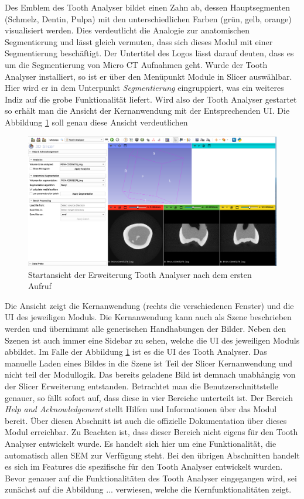 Des Emblem des Tooth Analyser bildet einen Zahn ab, dessen Hauptsegmenten (Schmelz,
Dentin, Pulpa) mit den unterschiedlichen Farben (grün, gelb, orange) visualisiert
werden. Dies verdeutlicht die Analogie zur anatomischen Segmentierung und lässt
gleich vermuten, dass sich dieses Modul mit einer Segmentierung beschäftigt. Der
Untertitel des Logos lässt darauf deuten, dass es um die Segmentierung von Micro
\ac{CT} Aufnahmen geht. Wurde der Tooth Analyser installiert, so ist er über den
Menüpunkt Module in Slicer auswählbar. Hier wird er in dem Unterpunkt \textit{Segmentierung}
eingruppiert, was ein weiteres Indiz auf die grobe Funktionalität liefert. Wird
also der Tooth Analyser gestartet so erhält man die Ansicht der Kernanwendung
mit der Entsprechenden \ac{UI}. Die Abbildung \ref{fig:tooth_analyser_start_up}
soll genau diese Ansicht verdeutlichen

\begin{figure}[h]
	\centering
	\includegraphics[scale=0.2, width=\textwidth]{img/toothAnalyserStarUp.png}
	\caption{Startansicht der Erweiterung Tooth Analyser nach dem ersten Aufruf}
	\label{fig:tooth_analyser_start_up}
\end{figure}

Die Ansicht zeigt die Kernanwendung (rechts die verschiedenen Fenster) und die
\ac{UI} des jeweiligen Moduls. Die Kernanwendung kann auch als Szene beschrieben
werden und übernimmt alle generischen Handhabungen der Bilder. Neben den Szenen ist
auch immer eine Sidebar zu sehen, welche die \ac{UI} des jeweiligen Moduls abbildet.
Im Falle der Abbildung \ref{fig:tooth_analyser_start_up} ist es die \ac{UI} des Tooth
Analyser. Das manuelle Laden eines Bildes in die Szene ist Teil der Slicer
Kernanwendung und nicht teil der Modullogik. Das bereits geladene Bild ist demnach
unabhängig von der Slicer Erweiterung entstanden. Betrachtet man die
Benutzerschnittstelle genauer, so fällt sofort auf, dass diese in vier Bereiche
unterteilt ist. Der Bereich \textit{Help and Acknowledgement} stellt Hilfen und
Informationen über das Modul bereit. Über diesen Abschnitt ist auch die offizielle
Dokumentation über dieses Modul erreichbar. Zu Beachten ist, dass dieser Bereich
nicht eigens für den Tooth Analyser entwickelt wurde. Es handelt sich hier um
eine Funktionalität, die automatisch allen \ac{SEM} zur Verfügung steht. Bei den
übrigen Abschnitten handelt es sich im Features die spezifische für den Tooth Analyser
entwickelt wurden. Bevor genauer auf die Funktionalitäten des Tooth Analyser
eingegangen wird, sei zunächst auf die Abbildung ... verwiesen, welche die
Kernfunktionalitäten zeigt.

